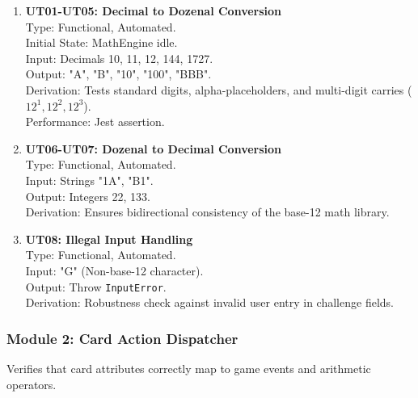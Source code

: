\documentclass[12pt, titlepage]{article}
\begin{document}
\begin{enumerate}
    \item \textbf{UT01-UT05: Decimal to Dozenal Conversion}\\
    Type: Functional, Automated. \\
    Initial State: MathEngine idle. \\
    Input: Decimals 10, 11, 12, 144, 1727. \\
    Output: "A", "B", "10", "100", "BBB". \\
    Derivation: Tests standard digits, alpha-placeholders, and multi-digit carries ($12^1, 12^2, 12^3$). \\
    Performance: Jest assertion.

    \item \textbf{UT06-UT07: Dozenal to Decimal Conversion}\\
    Type: Functional, Automated. \\
    Input: Strings "1A", "B1". \\
    Output: Integers 22, 133. \\
    Derivation: Ensures bidirectional consistency of the base-12 math library.

    \item \textbf{UT08: Illegal Input Handling}\\
    Type: Functional, Automated. \\
    Input: "G" (Non-base-12 character). \\
    Output: Throw \texttt{InputError}. \\
    Derivation: Robustness check against invalid user entry in challenge fields.
\end{enumerate}



\subsubsection{Module 2: Card Action Dispatcher}
Verifies that card attributes correctly map to game events and arithmetic operators.
\end{document}
